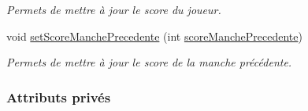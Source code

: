 \begin{DoxyCompactItemize}
\begin{DoxyCompactList}\small\item\em Permets de mettre à jour le score du joueur. \end{DoxyCompactList}\item 
void \hyperlink{class_joueur_aaa6acb88a58bb2af33176e1468ad2107}{set\+Score\+Manche\+Precedente} (int \hyperlink{class_joueur_ac78f2e83781d2bdeb9a613dc37812736}{score\+Manche\+Precedente})
\begin{DoxyCompactList}\small\item\em Permets de mettre à jour le score de la manche précédente. \end{DoxyCompactList}\end{DoxyCompactItemize}
\subsubsection*{Attributs privés}
